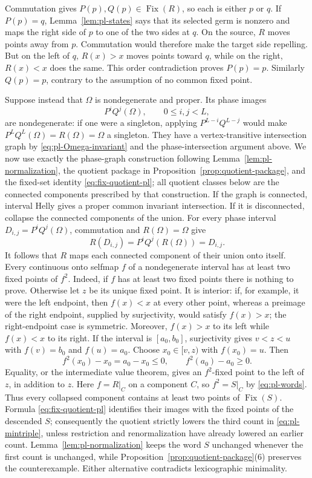 \documentclass[11pt]{article}
\theoremstyle{definition}
\theoremstyle{remark}
\newcommand{\Fix}{\operatorname{Fix}}
\begin{document}
Commutation gives \(P(p),Q(p)\in\Fix(R)\), so each is either \(p\) or \(q\).
If \(P(p)=q\), Lemma~\ref{lem:pl-states} says that its selected germ is
nonzero and maps the right side of \(p\) to one of the two sides at \(q\).
On the source, \(R\) moves points away from \(p\).
Commutation would therefore make the target side repelling.  But on the left
of \(q\), \(R(x)>x\) moves points toward \(q\), while on the right,
\(R(x)<x\) does the same.  This order contradiction proves \(P(p)=p\).
Similarly \(Q(p)=p\), contrary to the assumption of no common fixed point.

Suppose instead that \(\Omega\) is nondegenerate and proper.  Its phase
images
\[
 P^iQ^j(\Omega),\qquad0\leq i,j<L,
\]
are nondegenerate: if one were a singleton, applying
\(P^{L-i}Q^{L-j}\) would make
\(P^LQ^L(\Omega)=R(\Omega)=\Omega\) a singleton.  They have a
vertex-transitive intersection graph by
\eqref{eq:pl-Omega-invariant} and the phase-intersection argument
above.  We now use exactly the phase-graph construction following
Lemma~\ref{lem:pl-normalization}, the quotient package in
Proposition~\ref{prop:quotient-package}, and the fixed-set identity
\eqref{eq:fix-quotient-pl}; all quotient classes below are the connected
components prescribed by that construction.  If the
graph is connected, interval Helly gives a proper common invariant
intersection.  If it is disconnected, collapse the connected components of
the union.  For every phase interval \(D_{i,j}=P^iQ^j(\Omega)\), commutation
and \(R(\Omega)=\Omega\) give
\[
 R(D_{i,j})=P^iQ^j(R(\Omega))=D_{i,j}.
\]
It follows that \(R\) maps each connected component of their union onto
itself.  Every continuous onto selfmap \(f\) of a
nondegenerate interval has at least two fixed points of \(f^2\).  Indeed, if
\(f\) has at least two fixed points there is nothing to prove.  Otherwise
let \(z\) be its unique fixed point.  It is interior: if, for example, it
were the left endpoint, then \(f(x)<x\) at every other point, whereas a
preimage of the right endpoint, supplied by surjectivity, would satisfy
\(f(x)>x\); the right-endpoint case is symmetric.  Moreover,
\(f(x)>x\) to its left while \(f(x)<x\) to its right.  If the interval is
\([a_0,b_0]\), surjectivity gives \(v<z<u\) with
\(f(v)=b_0\) and \(f(u)=a_0\).  Choose \(x_0\in[v,z)\) with \(f(x_0)=u\).
Then
\[
 f^2(x_0)-x_0=a_0-x_0\leq0,\qquad
 f^2(a_0)-a_0\geq0.
\]
Equality, or the intermediate value theorem, gives an \(f^2\)-fixed point
to the left of \(z\), in addition to \(z\).  Here \(f=R|_C\) on a component
\(C\), so \(f^2=S|_C\) by \eqref{eq:pl-words}.  Thus every collapsed
component contains at least two points of \(\Fix(S)\).  Formula
\eqref{eq:fix-quotient-pl} identifies their images with the fixed points of
the descended \(S\); consequently the quotient strictly lowers the third
count in \eqref{eq:pl-mintriple}, unless restriction and renormalization have
already lowered an earlier count.  Lemma~\ref{lem:pl-normalization} keeps the
word \(S\) unchanged whenever the first count is unchanged, while
Proposition~\ref{prop:quotient-package}(6) preserves the counterexample.
Either alternative contradicts lexicographic minimality.
\end{document}
